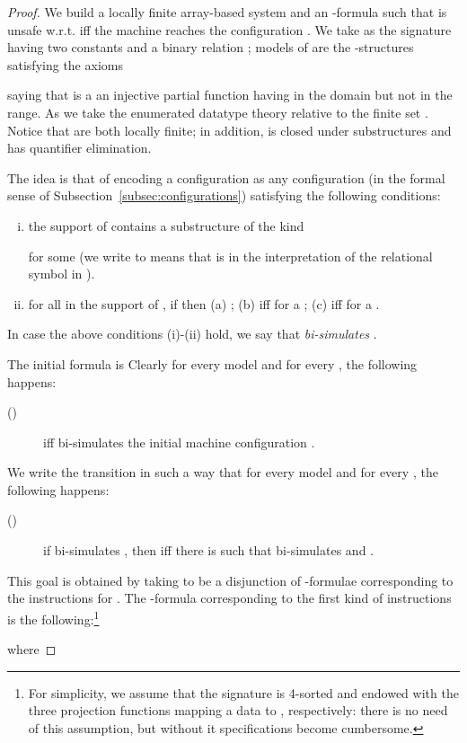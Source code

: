 \documentclass{LMCS}
\theoremstyle{plain}\newtheorem{assumption}[thm]{Assumption}
\theoremstyle{plain}\newtheorem{proposition}[thm]{Proposition}
\theoremstyle{plain}\newtheorem{property}[thm]{Property}
\theoremstyle{plain}\newtheorem{example}[thm]{Example}
\theoremstyle{plain}\newtheorem{claim}[thm]{Claim}
\theoremstyle{plain}\newtheorem{lemma}[thm]{Lemma}
\begin{document}
\begin{proof}
We build a locally finite array-based system  and an -formula  such that
 is unsafe w.r.t.  iff the machine  reaches
the configuration .  We take as  the signature
having two constants  and a binary relation ; models of
 are the -structures satisfying the axioms

saying that  is a an injective partial function having  in the
domain but not in the range.  As  we take the enumerated
datatype theory relative to the finite set .  Notice that  are both locally finite; in addition,
 is closed under substructures and  has quantifier
elimination.

The idea is that of encoding a configuration  as any
configuration  (in the formal sense of Subsection~\ref{subsec:configurations}) satisfying the following
conditions:
\begin{enumerate}[(i)]
 \item the support of  contains a substructure of the kind
   
   for some  (we write  to means that  is in
   the interpretation of the relational symbol  in ).
 \item for all  in the support of , if
    then (a) ; (b)  iff 
   for  a ; (c)  iff  for a .
\end{enumerate}
In case the above conditions (i)-(ii) hold, we say that \emph{
  bi-simulates }.

The initial formula  is 
Clearly for every model  and for every , the following happens:
\begin{description}
\item[{\rm ()}]  iff  bi-simulates the
  initial machine configuration .
\end{description}

We write the transition  in such a way that for every model
 and for every , the following
happens:
\begin{description}
\item[{\rm ()}] if  bi-simulates , then  iff there is  such that  bi-simulates
   and .
\end{description}
This goal is obtained by taking  to be a disjunction of
-formulae corresponding to the instructions for . The
-formula corresponding to the first kind of instructions
 is the following:\footnote{For simplicity,
we assume that the
  signature  is 4-sorted and endowed with the three
  projection functions  mapping a data  to , respectively:  
there is no need of this assumption,
  but without it specifications become cumbersome.}

where


\end{proof}
\end{document}
